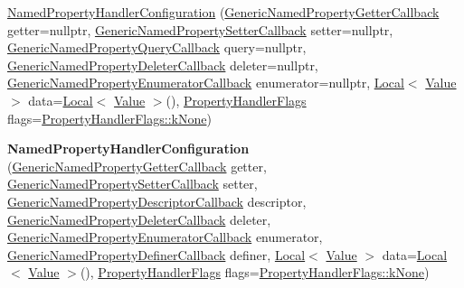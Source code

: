 \begin{DoxyCompactItemize}
\mbox{\hyperlink{structv8_1_1NamedPropertyHandlerConfiguration_a850a760f28c244b12042634687024e68}{Named\+Property\+Handler\+Configuration}} (\mbox{\hyperlink{namespacev8_a24b1801fa53a7c5a71366d8044927563}{Generic\+Named\+Property\+Getter\+Callback}} getter=nullptr, \mbox{\hyperlink{namespacev8_af74716c6e95a269c6cd4314662fd0a7e}{Generic\+Named\+Property\+Setter\+Callback}} setter=nullptr, \mbox{\hyperlink{namespacev8_add9f7ab11e4a9a2b9ad2c4536b0e1a64}{Generic\+Named\+Property\+Query\+Callback}} query=nullptr, \mbox{\hyperlink{namespacev8_ad2aecc0406ea4bc02d5a4f84a433b273}{Generic\+Named\+Property\+Deleter\+Callback}} deleter=nullptr, \mbox{\hyperlink{namespacev8_a20826eb7e52e84fa4f632534e8eddd04}{Generic\+Named\+Property\+Enumerator\+Callback}} enumerator=nullptr, \mbox{\hyperlink{classv8_1_1Local}{Local}}$<$ \mbox{\hyperlink{classv8_1_1Value}{Value}} $>$ data=\mbox{\hyperlink{classv8_1_1Local}{Local}}$<$ \mbox{\hyperlink{classv8_1_1Value}{Value}} $>$(), \mbox{\hyperlink{namespacev8_af4789f0aeb8680e353901a35810cac1a}{Property\+Handler\+Flags}} flags=\mbox{\hyperlink{namespacev8_af4789f0aeb8680e353901a35810cac1aa35c3ace1970663a16e5c65baa5941b13}{Property\+Handler\+Flags\+::k\+None}})
\item 
\mbox{\label{structv8_1_1NamedPropertyHandlerConfiguration_a0ebd93d818c0f5f3950d9a88a2715250}} 
{\bfseries Named\+Property\+Handler\+Configuration} (\mbox{\hyperlink{namespacev8_a24b1801fa53a7c5a71366d8044927563}{Generic\+Named\+Property\+Getter\+Callback}} getter, \mbox{\hyperlink{namespacev8_af74716c6e95a269c6cd4314662fd0a7e}{Generic\+Named\+Property\+Setter\+Callback}} setter, \mbox{\hyperlink{namespacev8_a8cf8faa26baffa84173a24906c0d49f6}{Generic\+Named\+Property\+Descriptor\+Callback}} descriptor, \mbox{\hyperlink{namespacev8_ad2aecc0406ea4bc02d5a4f84a433b273}{Generic\+Named\+Property\+Deleter\+Callback}} deleter, \mbox{\hyperlink{namespacev8_a20826eb7e52e84fa4f632534e8eddd04}{Generic\+Named\+Property\+Enumerator\+Callback}} enumerator, \mbox{\hyperlink{namespacev8_a66c854bc88d612ab4c65354bc0dc74a0}{Generic\+Named\+Property\+Definer\+Callback}} definer, \mbox{\hyperlink{classv8_1_1Local}{Local}}$<$ \mbox{\hyperlink{classv8_1_1Value}{Value}} $>$ data=\mbox{\hyperlink{classv8_1_1Local}{Local}}$<$ \mbox{\hyperlink{classv8_1_1Value}{Value}} $>$(), \mbox{\hyperlink{namespacev8_af4789f0aeb8680e353901a35810cac1a}{Property\+Handler\+Flags}} flags=\mbox{\hyperlink{namespacev8_af4789f0aeb8680e353901a35810cac1aa35c3ace1970663a16e5c65baa5941b13}{Property\+Handler\+Flags\+::k\+None}})
\end{DoxyCompactItemize}
